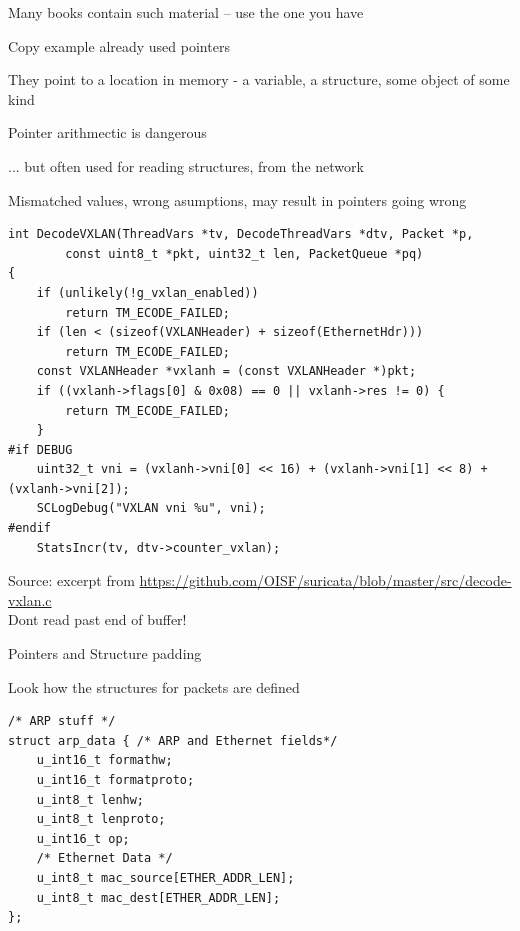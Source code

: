 \documentclass[Screen16to9,17pt]{foils}
\begin{document}
\centerline{Many books contain such material -- use the one you have}









\begin{list2}
\item Copy example already used pointers
\item They point to a location in memory - a variable, a structure, some object of some kind
\item Pointer arithmectic is dangerous
\item ... but often used for reading structures, from the network
\item Mismatched values, wrong asumptions, may result in pointers going wrong
\end{list2}




\begin{verbatim}
int DecodeVXLAN(ThreadVars *tv, DecodeThreadVars *dtv, Packet *p,
        const uint8_t *pkt, uint32_t len, PacketQueue *pq)
{
    if (unlikely(!g_vxlan_enabled))
        return TM_ECODE_FAILED;
    if (len < (sizeof(VXLANHeader) + sizeof(EthernetHdr)))
        return TM_ECODE_FAILED;
    const VXLANHeader *vxlanh = (const VXLANHeader *)pkt;
    if ((vxlanh->flags[0] & 0x08) == 0 || vxlanh->res != 0) {
        return TM_ECODE_FAILED;
    }
#if DEBUG
    uint32_t vni = (vxlanh->vni[0] << 16) + (vxlanh->vni[1] << 8) + (vxlanh->vni[2]);
    SCLogDebug("VXLAN vni %u", vni);
#endif
    StatsIncr(tv, dtv->counter_vxlan);
\end{verbatim}

Source: excerpt from \url{https://github.com/OISF/suricata/blob/master/src/decode-vxlan.c}\\
Dont read past end of buffer!



\begin{list2}
\item Pointers and Structure padding
\item Look how the structures for packets are defined
\end{list2}

\begin{verbatim}
/* ARP stuff */
struct arp_data { /* ARP and Ethernet fields*/
    u_int16_t formathw;
    u_int16_t formatproto;
    u_int8_t lenhw;
    u_int8_t lenproto;
    u_int16_t op;
    /* Ethernet Data */
    u_int8_t mac_source[ETHER_ADDR_LEN];
    u_int8_t mac_dest[ETHER_ADDR_LEN];
};
\end{verbatim}
\end{document}
